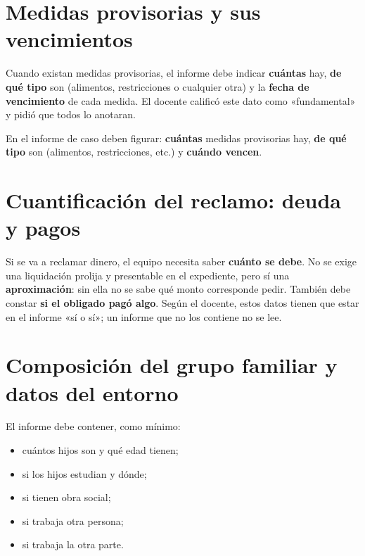 \documentclass[12pt,oneside]{book}
\begin{document}

\section{Medidas provisorias y sus vencimientos}

Cuando existan medidas provisorias, el informe debe indicar \textbf{cuántas} hay, \textbf{de qué tipo} son (alimentos, restricciones o cualquier otra) y la \textbf{fecha de vencimiento} de cada medida. El docente calificó este dato como «fundamental» y pidió que todos lo anotaran.

\begin{important}
En el informe de caso deben figurar: \textbf{cuántas} medidas provisorias hay, \textbf{de qué tipo} son (alimentos, restricciones, etc.) y \textbf{cuándo vencen}.
\end{important}

\section{Cuantificación del reclamo: deuda y pagos}

Si se va a reclamar dinero, el equipo necesita saber \textbf{cuánto se debe}. No se exige una liquidación prolija y presentable en el expediente, pero sí una \textbf{aproximación}: sin ella no se sabe qué monto corresponde pedir. También debe constar \textbf{si el obligado pagó algo}. Según el docente, estos datos tienen que estar en el informe «sí o sí»; un informe que no los contiene no se lee.

\section{Composición del grupo familiar y datos del entorno}

El informe debe contener, como mínimo:

\begin{itemize}
    \item cuántos hijos son y qué edad tienen;
    \item si los hijos estudian y dónde;
    \item si tienen obra social;
    \item si trabaja otra persona;
    \item si trabaja la otra parte.
\end{itemize}
\end{document}
